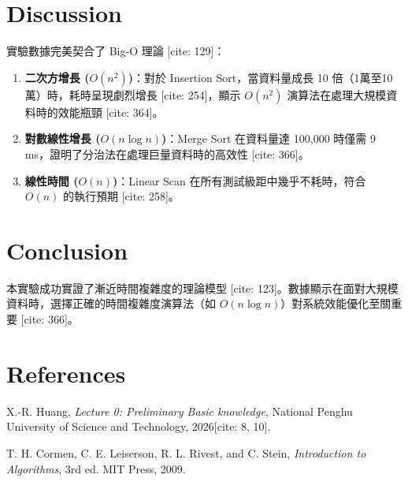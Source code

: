 \documentclass[conference, a4paper]{IEEEtran}
\begin{document}
\section{Discussion}
實驗數據完美契合了 Big-O 理論 [cite: 129]：
\begin{enumerate}
    \item \textbf{二次方增長 ($O(n^2)$)}：對於 Insertion Sort，當資料量成長 10 倍（1萬至10萬）時，耗時呈現劇烈增長 [cite: 254]，顯示 $O(n^2)$ 演算法在處理大規模資料時的效能瓶頸 [cite: 364]。
    \item \textbf{對數線性增長 ($O(n \log n)$)}：Merge Sort 在資料量達 100,000 時僅需 9 ms，證明了分治法在處理巨量資料時的高效性 [cite: 366]。
    \item \textbf{線性時間 ($O(n)$)}：Linear Scan 在所有測試級距中幾乎不耗時，符合 $O(n)$ 的執行預期 [cite: 258]。
\end{enumerate}

\section{Conclusion}
本實驗成功實證了漸近時間複雜度的理論模型 [cite: 123]。數據顯示在面對大規模資料時，選擇正確的時間複雜度演算法（如 $O(n \log n)$）對系統效能優化至關重要 [cite: 366]。

\section{References}
\noindent [1] X.-R. Huang, \textit{Lecture 0: Preliminary Basic knowledge}, National Penghu University of Science and Technology, 2026[cite: 8, 10]. \par
\noindent [2] T. H. Cormen, C. E. Leiserson, R. L. Rivest, and C. Stein, \textit{Introduction to Algorithms}, 3rd ed. MIT Press, 2009.
\end{document}
